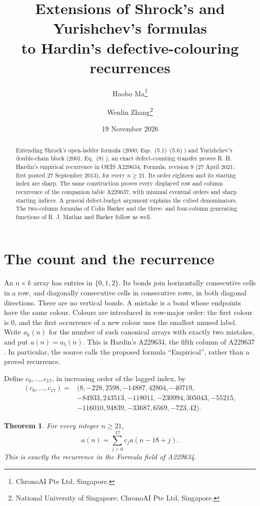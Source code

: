 \documentclass[11pt]{article}
\title{Extensions of Shrock's and Yurishchev's formulas\protect\\to Hardin's defective-colouring recurrences}
\author{Haobo Ma\thanks{ChronoAI Pte Ltd, Singapore.}\and
Wenlin Zhang\thanks{National University of Singapore; ChronoAI Pte Ltd, Singapore.}}
\date{19 November 2026}
\newtheorem{theorem}{Theorem}
\begin{document}
\maketitle
\begin{abstract}
Extending Shrock's open-ladder formula (2000,
Eqs.~(5.1)--(5.6) \cite{shrock}) and Yurishchev's double-chain block
(2001, Eq.~(9) \cite{yurishchev}), an exact defect-counting transfer
proves R. H. Hardin's empirical recurrence in OEIS A229634, Formula,
revision 9 (27 April 2021; first posted 27 September 2013),
for every $n\geq21$.
Its order eighteen and its starting index are sharp.
The same construction proves every displayed row and column recurrence
of the companion table A229637, with minimal eventual orders and sharp
starting indices. A general defect-budget argument explains the cubed
denominators. The two-column formulas of Colin Barker and the
three- and four-column generating functions of R. J. Mathar and Barker
follow as well.
\end{abstract}

\section{The count and the recurrence}
An $n\times k$ array has entries in $\{0,1,2\}$.
Its bonds join horizontally consecutive cells in a row, and diagonally
consecutive cells in consecutive rows, in both diagonal directions.
There are no vertical bonds. A mistake is a bond whose endpoints have
the same colour. Colours are introduced in row-major order: the first
colour is $0$, and the first occurrence of a new colour uses the smallest
unused label. Write $a_k(n)$ for the number of such canonical arrays
with exactly two mistakes, and put $a(n)=a_5(n)$.
This is Hardin's A229634, the fifth column of A229637
\cite{hardin5,hardintable}. In particular, the source calls the proposed
formula ``Empirical'', rather than a proved recurrence.

Define $c_0,\ldots,c_{17}$, in increasing order of the lagged index, by
\begin{equation}\label{eq:coefficients}
\begin{split}
(c_0,\ldots,c_{17})={}&(8,-228,2598,-14887,42804,-40719,\\
&-84933,243513,-118011,-230994,305043,-55215,\\
&-116010,94839,-33687,6569,-723,42).
\end{split}
\end{equation}
\begin{theorem}\label{thm:main}
For every integer $n\geq21$,
\begin{equation}\label{eq:recurrence}
a(n)=\sum_{j=0}^{17}c_j a(n-18+j).
\end{equation}
This is exactly the recurrence in the Formula field of A229634.
\end{theorem}
\end{document}
